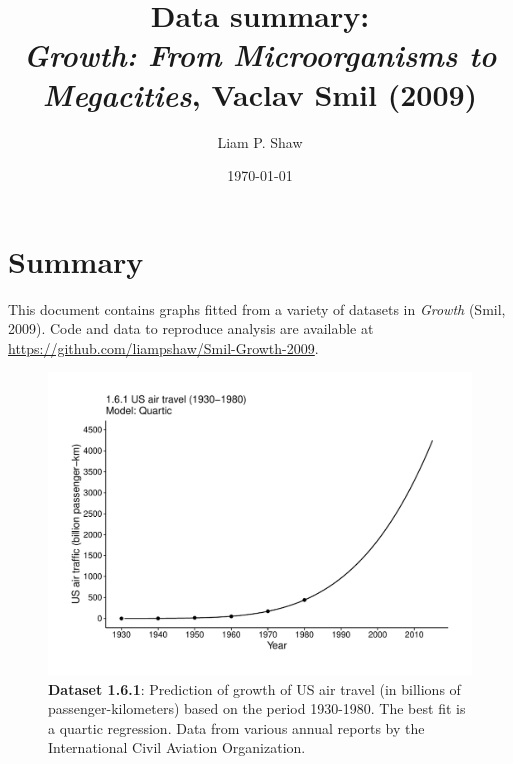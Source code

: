 \documentclass[aps,rmp,preprint,superscriptaddress,10pt,onecolumn]{article}
\begin{document}
\title{Data summary:\\\textit{Growth: From Microorganisms to Megacities}, Vaclav Smil (2009)}
\author{Liam P. Shaw}
\date{\today}


\maketitle

\section*{Summary}

\noindent This document contains graphs fitted from a variety of datasets in \textit{Growth} (Smil, 2009). Code and data to reproduce analysis are available at \url{https://github.com/liampshaw/Smil-Growth-2009}. 
\clearpage
\begin{figure}[h]
\includegraphics[width=\textwidth]{output/figs-ggplot/1.6.1.pdf}
\caption{\textbf{Dataset 1.6.1}: Prediction of growth of US air travel (in billions of passenger-kilometers) based on the period 1930-1980. The best fit is a quartic regression. Data from various annual reports by the International Civil Aviation Organization. }
\end{figure}
	
\end{document}
